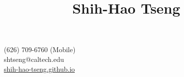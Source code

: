 \title{Shih-Hao Tseng}{
}{
(626) 709-6760 (Mobile)\\
shtseng@caltech.edu\\ %
\href{http://shih-hao-tseng.github.io}{shih-hao-tseng.github.io}%
}
